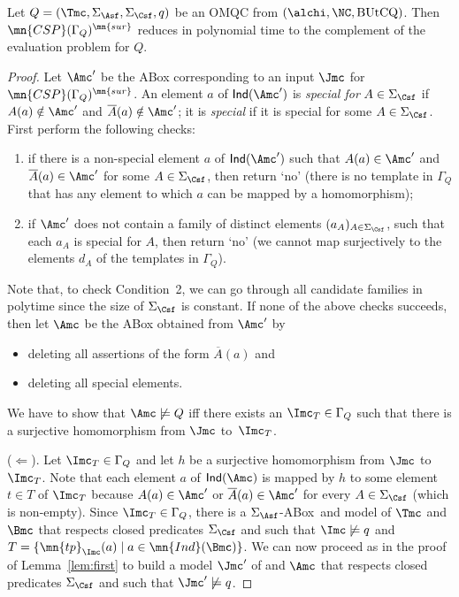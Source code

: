 \documentclass{lmcs}
\theoremstyle{definition}
\begin{document}
\begin{lem}
   Let $Q=(\Tmc,\Sigma_\Asf,\Sigma_\Csf,q)$ be an OMQC from
  $(\alchi,\NC,\text{BUtCQ})$. Then $\mn{CSP}(\Gamma_{Q})^{\mn{sur}}$ 
  reduces in polynomial time to the complement of the evaluation problem for $Q$.
\end{lem}
%
\begin{proof}
  Let $\Amc'$ be the ABox corresponding to an input $\Jmc$ for $\mn{CSP}(\Gamma_{Q})^{\mn{sur}}$. An
  element $a$ of ${\sf Ind}(\Amc')$ is \emph{special for} $A \in \Sigma_{\Csf}$ if
  $A(a) \notin \Amc'$ and $\overline{A}(a) \notin \Amc'$; it is
  \emph{special} if it is special for some $A \in \Sigma_{\Csf}$.
  First perform the following checks:
  \begin{enumerate}

  \item if there is a non-special element $a$ of ${\sf Ind}(\Amc')$ such that
    $A(a) \in \Amc'$ and $\overline{A}(a) \in \Amc'$ for some $A \in
    \Sigma_{\Csf}$, then return `no' (there is no template in $\Gamma_{Q}$
    that has any element to which $a$ can be mapped by a
    homomorphism);

  \item if $\Amc'$ does not contain a family of distinct elements
    $(a_A)_{A \in \Sigma_{\Csf}}$, such that each $a_A$ is special for
    $A$, then return `no' (we cannot map surjectively to the elements
    $d_A$ of the templates in $\Gamma_{Q}$).

  \end{enumerate}
  Note that, to check Condition~2, we can go through all candidate
  families in polytime since the size of $\Sigma_{\Csf}$ is constant.
  If none of the above checks succeeds, then let $\Amc$ be the ABox
  obtained from $\Amc'$ by
  \begin{itemize}

  \item deleting all assertions of the form $\overline{A}(a)$ and

  \item deleting all special elements.

  \end{itemize}
  We have to show that $\Amc \not\models Q$ iff there exists an $\Imc_T 
  \in \Gamma_{Q}$ such that there is a surjective homomorphism from $\Jmc$  
  to~$\Imc_T$.

  \smallskip
  \noindent
  ($\Leftarrow$). Let $\Imc_T \in \Gamma_{Q}$ and let $h$ be a surjective
  homomorphism from $\Jmc$ to $\Imc_T$. Note that each element $a$ of
  ${\sf Ind}(\Amc)$ is mapped by $h$ to some element $t \in T$ of $\Imc_T$ because
  $A(a) \in \Amc'$ or $\overline{A}(a) \in \Amc'$ for every $A \in
  \Sigma_{\Csf}$ (which is non-empty). Since $\Imc_T \in \Gamma_{Q}$,
  there is a $\Sigma_{\Asf}$-ABox~\Bmc and model \Imc of $\Tmc$ and
  $\Bmc$ that respects closed predicates $\Sigma_{\Csf}$ and such that
  $\Imc \not\models q$ and $ T = \{ \mn{tp}_\Imc(a) \mid a \in
  \mn{Ind}(\Bmc) \}$. We can now proceed as in the proof of
  Lemma~\ref{lem:first} to build a model $\Jmc'$ of \Tmc and $\Amc$ that
  respects closed predicates $\Sigma_{\Csf}$ and such that $\Jmc'\not\models q$.


\end{proof}
\end{document}
